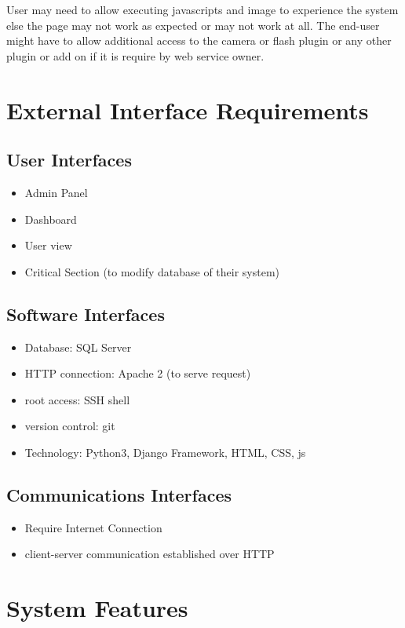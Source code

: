 \documentclass{scrreprt}
\begin{document}
User may need to allow executing javascripts and image to experience the system else the page may not work as expected or may not work at all.
The end-user might have to allow additional access to the camera or flash plugin or any other plugin or add on if it is require by web service owner.
 

\chapter{External Interface Requirements}

\section{User Interfaces}
\begin{itemize}
	\item Admin Panel
	\item Dashboard
	\item User view
	\item Critical Section (to modify database of their system)
\end{itemize}

\section{Software Interfaces}
\begin{itemize}
	\item Database: SQL Server
	\item HTTP connection: Apache 2 (to serve request)
	\item root access: SSH shell
	\item version control: git
	\item Technology: Python3, Django Framework, HTML, CSS, js
\end{itemize}

\section{Communications Interfaces}
\begin{itemize}
	\item Require Internet Connection
	\item client-server communication established over HTTP
\end{itemize}

\chapter{System Features}
\end{document}
